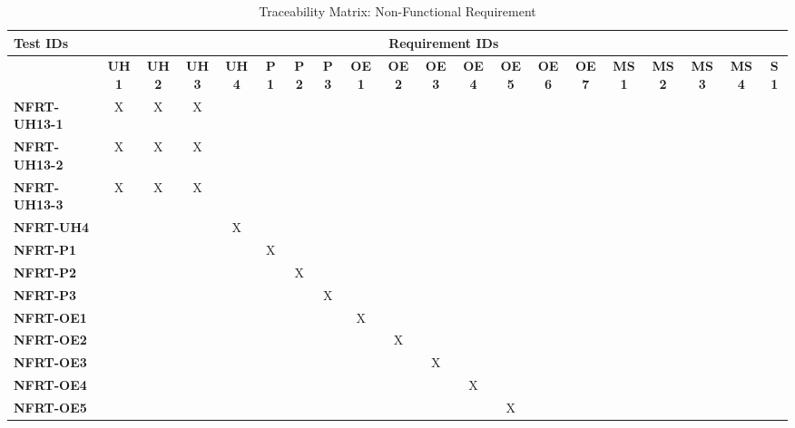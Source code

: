 \documentclass[12pt, titlepage]{article}
\begin{document}
\newpage
\begin{landscape}
\begin{table}[H]
    \centering
    \caption{Traceability Matrix: Non-Functional Requirement}
    \begin{adjustbox}{width=\paperwidth}
    \begin{tabular}{l|ccccccccccccccccccc}
        \textbf{Test IDs} & \multicolumn{19}{c}{\textbf{Requirement IDs}}\\
        \hline
        ~ & \textbf{UH1} & \textbf{UH2} & \textbf{UH3} & \textbf{UH4} & \textbf{P1} & \textbf{P2} & \textbf{P3} & \textbf{OE1} & \textbf{OE2} & \textbf{OE3} & \textbf{OE4} & \textbf{OE5} & \textbf{OE6} & \textbf{OE7} & \textbf{MS1} & \textbf{MS2} & \textbf{MS3} & \textbf{MS4} & \textbf{S1}\\
        \textbf{NFRT-UH13-1}    & X & X & X & ~ & ~ & ~ & ~ & ~ & ~ & ~ & ~ & ~ & ~ & ~ & ~ & ~ & ~ & ~ & ~\\
        \textbf{NFRT-UH13-2}    & X & X & X & ~ & ~ & ~ & ~ & ~ & ~ & ~ & ~ & ~ & ~ & ~ & ~ & ~ & ~ & ~ & ~\\
        \textbf{NFRT-UH13-3}    & X & X & X & ~ & ~ & ~ & ~ & ~ & ~ & ~ & ~ & ~ & ~ & ~ & ~ & ~ & ~ & ~ & ~\\
        \textbf{NFRT-UH4}       & ~ & ~ & ~ & X & ~ & ~ & ~ & ~ & ~ & ~ & ~ & ~ & ~ & ~ & ~ & ~ & ~ & ~ & ~\\
        \textbf{NFRT-P1}        & ~ & ~ & ~ & ~ & X & ~ & ~ & ~ & ~ & ~ & ~ & ~ & ~ & ~ & ~ & ~ & ~ & ~ & ~\\
        \textbf{NFRT-P2}        & ~ & ~ & ~ & ~ & ~ & X & ~ & ~ & ~ & ~ & ~ & ~ & ~ & ~ & ~ & ~ & ~ & ~ & ~\\
        \textbf{NFRT-P3}        & ~ & ~ & ~ & ~ & ~ & ~ & X & ~ & ~ & ~ & ~ & ~ & ~ & ~ & ~ & ~ & ~ & ~ & ~\\
        \textbf{NFRT-OE1}       & ~ & ~ & ~ & ~ & ~ & ~ & ~ & X & ~ & ~ & ~ & ~ & ~ & ~ & ~ & ~ & ~ & ~ & ~\\
        \textbf{NFRT-OE2}       & ~ & ~ & ~ & ~ & ~ & ~ & ~ & ~ & X & ~ & ~ & ~ & ~ & ~ & ~ & ~ & ~ & ~ & ~\\
        \textbf{NFRT-OE3}       & ~ & ~ & ~ & ~ & ~ & ~ & ~ & ~ & ~ & X & ~ & ~ & ~ & ~ & ~ & ~ & ~ & ~ & ~\\
        \textbf{NFRT-OE4}       & ~ & ~ & ~ & ~ & ~ & ~ & ~ & ~ & ~ & ~ & X & ~ & ~ & ~ & ~ & ~ & ~ & ~ & ~\\
        \textbf{NFRT-OE5}       & ~ & ~ & ~ & ~ & ~ & ~ & ~ & ~ & ~ & ~ & ~ & X & ~ & ~ & ~ & ~ & ~ & ~ & ~\\

\end{tabular}
\end{adjustbox}
\end{table}
\end{landscape}
\end{document}
